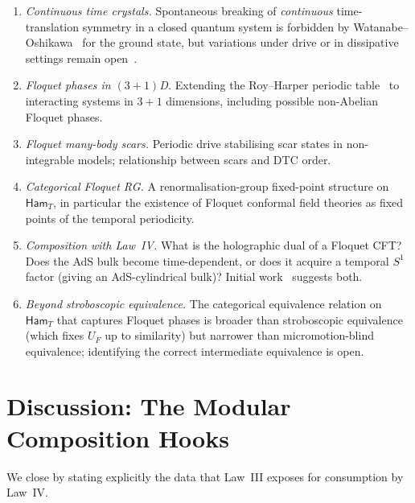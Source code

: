 \documentclass[12pt]{article}
\theoremstyle{definition}
\theoremstyle{remark}
\newcommand{\Ham}{\mathsf{Ham}}
\begin{document}
\begin{enumerate}
\item \emph{Continuous time crystals.} Spontaneous breaking of \emph{continuous} time-translation symmetry in a closed quantum system is forbidden by Watanabe--Oshikawa~\cite{watanabe2015} for the ground state, but variations under drive or in dissipative settings remain open~\cite{khemani2019}.
\item \emph{Floquet phases in $(3+1)$D.} Extending the Roy--Harper periodic table~\cite{roy2017} to interacting systems in $3+1$ dimensions, including possible non-Abelian Floquet phases.
\item \emph{Floquet many-body scars.} Periodic drive stabilising scar states in non-integrable models; relationship between scars and DTC order.
\item \emph{Categorical Floquet RG.} A renormalisation-group fixed-point structure on $\Ham_T$, in particular the existence of Floquet conformal field theories as fixed points of the temporal periodicity.
\item \emph{Composition with Law~IV.} What is the holographic dual of a Floquet CFT? Does the AdS bulk become time-dependent, or does it acquire a temporal $S^1$ factor (giving an AdS-cylindrical bulk)? Initial work~\cite{anous2020} suggests both.
\item \emph{Beyond stroboscopic equivalence.} The categorical equivalence relation on $\Ham_T$ that captures Floquet phases is broader than stroboscopic equivalence (which fixes $U_F$ up to similarity) but narrower than micromotion-blind equivalence; identifying the correct intermediate equivalence is open.
\end{enumerate}

\section{Discussion: The Modular Composition Hooks}
\label{sec:discussion}

We close by stating explicitly the data that Law~III exposes for consumption by Law~IV.
\end{document}
